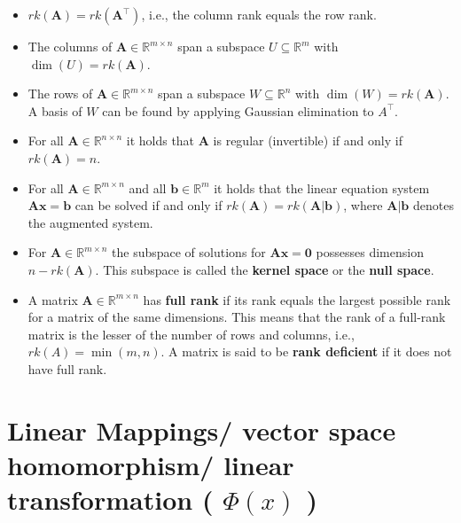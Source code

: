 \begin{itemize}
    \item $rk(\mathbf{A}) = rk(\mathbf{A}^\top)$, i.e., the column rank equals the row rank.

    \item The columns of $\mathbf{A} \in \mathbb{R}^{m \times n}$ span a subspace $U \subseteq \mathbb{R}^m$ with $\dim(U) = rk(\mathbf{A})$. 

    \item The rows of $\mathbf{A} \in \mathbb{R}^{m\times n}$ span a subspace $W \subseteq \mathbb{R}^n$ with $\dim(W) = rk(\mathbf{A})$. A basis of $W$ can be found by applying Gaussian elimination to $A^\top$.

    \item For all $\mathbf{A} \in \mathbb{R}^{n\times n}$ it holds that $\mathbf{A}$ is regular (invertible) if and only if $rk(\mathbf{A}) = n$.

    \item For all $\mathbf{A} \in \mathbb{R}^{m\times n}$ and all $\mathbf{b} \in \mathbb{R}^m$ it holds that the linear equation system $\mathbf{Ax = b}$ can be solved if and only if $rk(\mathbf{A}) = rk(\mathbf{A}|\mathbf{b})$, where $\mathbf{A}|\mathbf{b}$ denotes the augmented system.

    \item For $\mathbf{A} \in \mathbb{R}^{m\times n}$ the subspace of solutions for $\mathbf{Ax = 0}$ possesses dimension $n - rk(\mathbf{A})$. This subspace is called the \textbf{kernel space} or the \textbf{null space}.

    \item A matrix $\mathbf{A} \in \mathbb{R}^{m\times n}$ has \textbf{full rank} if its rank equals the largest possible rank for a matrix of the same dimensions. This means that the rank of a full-rank matrix is the lesser of the number of rows and columns, i.e., $rk(A) = \min(m, n)$. A matrix is said to be \textbf{rank deficient} if it does not have full rank.

\end{itemize}


\section{Linear Mappings/ vector space homomorphism/ linear transformation ( $\Phi(x)$ ) \cite{mfml-1}}\label{Linear Mappings/ vector space homomorphism/ linear transformation}


